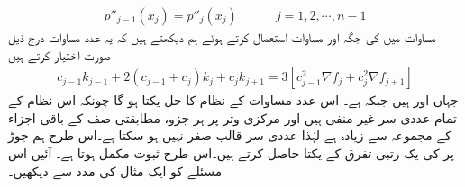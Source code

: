 \begin{align*}
p''_{j-1}(x_j)=p''_j(x_j)\quad \quad \quad j=1,2,\cdots,n-1
\end{align*}
مساوات  میں  کی جگہ   اور مساوات   استعمال کرتے ہوئے ہم دیکھتے ہیں کہ یہ  عدد مساوات درج ذیل صورت اختیار کرتے ہیں
\begin{align}\label{مساوات_اعدادی_دو_درجی_تفرق_پ}
c_{j-1}k_{j-1}+2(c_{j-1}+c_j)k_j+c_jk_{j+1}=3[c^2_{j-1}\nabla f_j+c_j^2\nabla f_{j+1}]
\end{align} 
جہاں  اور  ہیں جبکہ  ہے۔ اس  عدد مساوات کے نظام کا حل  یکتا ہو گا چونکہ اس نظام کے تمام عددی سر غیر منفی ہیں اور مرکزی وتر پر ہر جزو، مطابقتی صف کے باقی  اجزاء کے مجموعہ سے زیادہ  ہے  لہٰذا عددی سر قالب صفر نہیں ہو سکتا ہے۔اس طرح ہم جوڑ پر  کی یک رتبی تفرق کے یکتا  حاصل کرتے ہیں۔اس طرح ثبوت مکمل ہوتا ہے۔
آئیں اس مسئلے کو ایک مثال کی مدد سے دیکھیں۔

